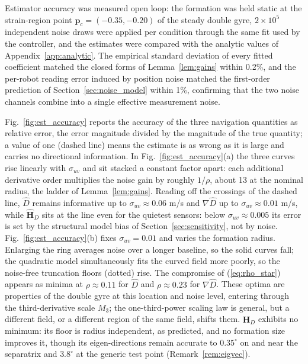 \documentclass[lettersize,journal]{IEEEtran}
\begin{document}
Estimator accuracy was measured open loop: the formation was held static
at the strain-region point $\mathbf{p}_c = (-0.35, -0.20)$ of the steady
double gyre, $2 \times 10^5$ independent noise draws were applied per
condition through the same fit used by the controller, and the estimates
were compared with the analytic values of Appendix~\ref{app:analytic}.
The empirical standard deviation of every fitted coefficient matched the
closed forms of Lemma~\ref{lem:gains} within 0.2\%, and the per-robot
reading error induced by position noise matched the first-order
prediction of Section~\ref{sec:noise_model} within 1\%, confirming that
the two noise channels combine into a single effective measurement noise.

Fig.~\ref{fig:est_accuracy} reports the accuracy of the three navigation
quantities as relative error, the error magnitude divided by the
magnitude of the true quantity; a value of one (dashed line) means the
estimate is as wrong as it is large and carries no directional
information. In Fig.~\ref{fig:est_accuracy}(a) the three curves rise
linearly with $\sigma_{uv}$ and sit stacked a constant factor apart: each
additional derivative order multiplies the noise gain by roughly
$1/\rho$, about 13 at the nominal radius, the ladder of
Lemma~\ref{lem:gains}. Reading off the crossings of the dashed line,
$\hat{D}$ remains informative up to $\sigma_{uv} \approx 0.06$ m/s and
$\nabla\hat{D}$ up to $\sigma_{uv} \approx 0.01$ m/s, while
$\hat{\mathbf{H}}_D$ sits at the line even for the quietest sensors:
below $\sigma_{uv} \approx 0.005$ its error is set by the structural
model bias of Section~\ref{sec:sensitivity}, not by noise.
Fig.~\ref{fig:est_accuracy}(b) fixes $\sigma_{uv} = 0.01$ and varies the
formation radius. Enlarging the ring averages noise over a longer
baseline, so the solid curves fall; the quadratic model simultaneously
fits the curved field more poorly, so the noise-free truncation floors
(dotted) rise. The compromise of (\ref{eq:rho_star}) appears as minima
at $\rho \approx 0.11$ for $\hat{D}$ and $\rho \approx 0.23$ for
$\nabla\hat{D}$. These optima are properties of the double gyre at this
location and noise level, entering through the third-derivative scale
$M_3$; the one-third-power scaling law is general, but a different
field, or a different region of the same field, shifts them.
$\hat{\mathbf{H}}_D$ exhibits no minimum: its floor is radius
independent, as predicted, and no formation size improves it, though its
eigen-directions remain accurate to $0.35^\circ$ on and near the
separatrix and $3.8^\circ$ at the generic test point
(Remark~\ref{rem:eigvec}).
\end{document}
